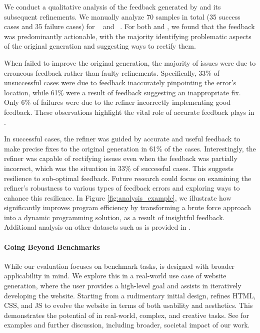 We conduct a qualitative analysis of the feedback generated by \ours and its subsequent refinements. We manually analyze 70 samples in total (35 success cases and 35 failure cases) for \codeopt~\citep{pie} and \gsm~\citep{cobbe2021training}. For both \gsm and \codeopt, we found that the feedback was predominantly actionable, with the majority identifying problematic aspects of the original generation and suggesting ways to rectify them.















When \ours failed to improve the original generation, the majority of issues were due to erroneous feedback rather than faulty refinements. Specifically, 33\% of unsuccessful cases were due to feedback inaccurately pinpointing the error's location, while 61\% were a result of feedback suggesting an inappropriate fix. Only 6\% of failures were due to the refiner incorrectly implementing good feedback. These observations highlight the vital role of accurate feedback plays in \ours.

In successful cases, the refiner was guided by accurate and useful feedback to make precise fixes to the original generation in 61\% of the cases. Interestingly, the refiner was capable of rectifying issues even when the feedback was partially incorrect, which was the situation in 33\% of successful cases. This suggests resilience to sub-optimal feedback. Future research could focus on examining the refiner's robustness to various types of feedback errors and exploring ways to enhance this resilience. 
In Figure \ref{fig:analysis_example}, we illustrate how \ours significantly improves program efficiency by transforming a brute force approach into a dynamic programming solution, as a result of insightful feedback. Additional analysis on other datasets such as \dialgen is provided in .




\paragraph{Going Beyond Benchmarks}
While our evaluation focuses on benchmark tasks, \ours is designed with broader applicability in mind. We explore this in a real-world use case of website generation, where the user provides a high-level goal and \ours assists in iteratively developing the website. Starting from a rudimentary initial design, \ours refines HTML, CSS, and JS to evolve the website in terms of both usability and aesthetics. This demonstrates the potential of \ours in real-world, complex, and creative tasks. See  for examples and further discussion, including broader, societal impact of our work.









